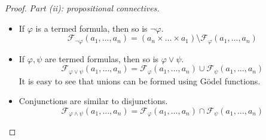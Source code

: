\begin{proof}
    \emph{Part (ii): propositional connectives.}
    \begin{itemize}
        \item If \( \varphi \) is a termed formula, then so is \( \neg\varphi \).
        \[ \mathcal F_{\neg\varphi}(a_1, \dots, a_n) = (a_n \times \dots \times a_1) \setminus \mathcal F_\varphi(a_1, \dots, a_n) \]
        \item If \( \varphi, \psi \) are termed formulas, then so is \( \varphi \vee \psi \).
        \[ \mathcal F_{\varphi \vee \psi}(a_1, \dots, a_n) = \mathcal F_\varphi(a_1, \dots, a_n) \cup \mathcal F_\psi(a_1, \dots, a_n) \]
        It is easy to see that unions can be formed using G\"odel functions.
        \item Conjunctions are similar to disjunctions.
        \[ \mathcal F_{\varphi \wedge \psi}(a_1, \dots, a_n) = \mathcal F_\varphi(a_1, \dots, a_n) \cap \mathcal F_\psi(a_1, \dots, a_n) \]
    \end{itemize}


\end{proof}
